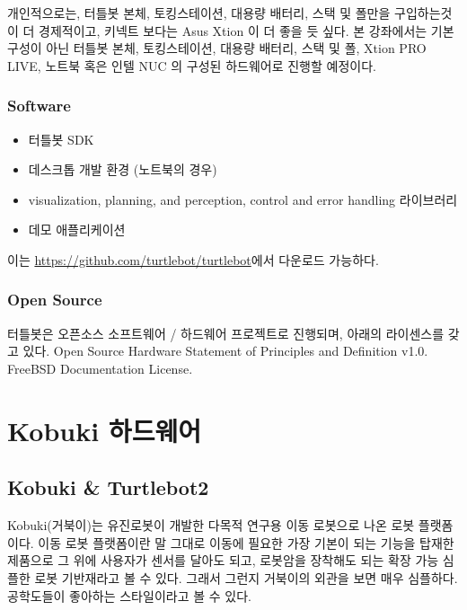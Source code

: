 \noindent
개인적으로는, 터틀봇 본체, 토킹스테이션, 대용량 배터리, 스택 및 폴만을 구입하는것이 더 경제적이고, 키넥트 보다는 Asus Xtion 이 더 좋을 듯 싶다. 본 강좌에서는 기본 구성이 아닌 터틀봇 본체, 토킹스테이션, 대용량 배터리, 스택 및 폴, Xtion PRO LIVE, 노트북 혹은 인텔 NUC 의 구성된 하드웨어로 진행할 예정이다.

\subsubsection{Software}

\begin{itemize}[leftmargin=*]
\item 터틀봇 SDK
\item 데스크톱 개발 환경 (노트북의 경우)
\item visualization, planning, and perception, control and error handling 라이브러리
\item 데모 애플리케이션
\end{itemize}

이는 \url{https://github.com/turtlebot/turtlebot}에서 다운로드 가능하다.


\subsubsection{Open Source}
터틀봇은 오픈소스 소프트웨어 / 하드웨어 프로젝트로 진행되며, 아래의 라이센스를 갖고 있다.
Open Source Hardware Statement of Principles and Definition v1.0. 
FreeBSD Documentation License.

\section{Kobuki 하드웨어}

\subsection{Kobuki \& Turtlebot2}

Kobuki(거북이)는 유진로봇이 개발한 다목적 연구용 이동 로봇으로 나온 로봇 플랫폼이다. 이동 로봇 플랫폼이란 말 그대로 이동에 필요한 가장 기본이 되는 기능을 탑재한 제품으로 그 위에 사용자가 센서를 달아도 되고, 로봇암을 장착해도 되는 확장 가능 심플한 로봇 기반재라고 볼 수 있다. 그래서 그런지 거북이의 외관을 보면 매우 심플하다. 공학도들이 좋아하는 스타일이라고 볼 수 있다. 

